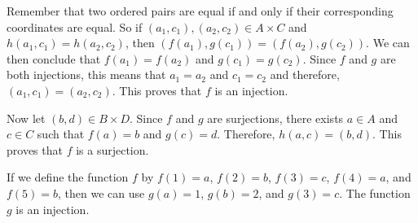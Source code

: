 \begin{list}{\bf{\ref{exer:sec92-7}.}}
\item \begin{list}{\bf{(a)}}
\item Remember that two ordered pairs are equal if and only if their corresponding coordinates are equal.  So if $\left( a_1, c_1 \right) , \left( a_2, c_2 \right) \in A \times C$ and $h \left( a_1, c_1 \right) = h \left( a_2, c_2 \right)$, then 
$\left( f \left( a_1 \right), g \left( c_1 \right) \right) = 
\left( f \left( a_2 \right), g \left( c_2 \right) \right)$.  We can then conclude that 
$f \left( a_1 \right) = f \left( a_2 \right)$ and $g \left( c_1 \right) = g \left( c_2 \right)$.  Since $f$ and $g$ are both injections, this means that $a_1 = a_2$ and $c_1 = c_2$ and therefore, 
$\left( a_1, c_1 \right) = \left( a_2, c_2 \right)$.  This proves that $f$ is an injection.

Now let $\left( b, d \right) \in B \times D$.  Since $f$ and $g$ are surjections, there exists 
$a \in A$ and $c \in C$ such that $f \left( a \right) = b$ and $g \left( c \right) = d$.  Therefore, $h \left( a, c \right) = \left( b, d \right)$.  This proves that $f$ is a surjection.
\end{list}
\end{list}


\begin{list}{\bf{\ref{exer:sec927}.}}
\item \begin{list}{\bf{(a)}}
\item If we define the function $f$ by $f ( 1 ) = a$, $f ( 2 ) = b$, 
$f ( 3 ) = c$, $f ( 4 ) = a$, and $f ( 5 ) = b$, then we can use 
 $g ( a ) = 1$, $g ( b ) = 2$, and $g ( 3 ) = c$.  The function $g$ is an injection.
\end{list}
\end{list}




\hbreak

\endinput


